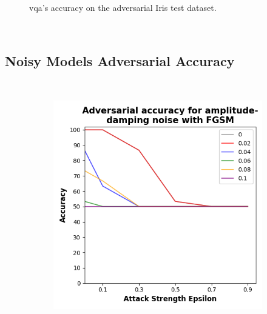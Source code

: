\begin{figure}[!h]
  \caption{\ac{vqa}'s accuracy on the adversarial Iris test dataset.}
  \label{fig:iris-34}
\end{figure} \

\subsection{Noisy Models Adversarial Accuracy}\label{subsection:iris-noisy-adv-acc} \


\begin{figure}[!h]
  \centering

  \begin{subfigure}{0.45\textwidth}
      \includegraphics[width=\linewidth]{figures/evaluation_results/iris/pqc/figures/amplitude-damping-fgsm.png}
      \label{fig:iris5}
  \end{subfigure} \qquad
  \begin{subfigure}{0.45\textwidth}

\end{subfigure}
\end{figure}
